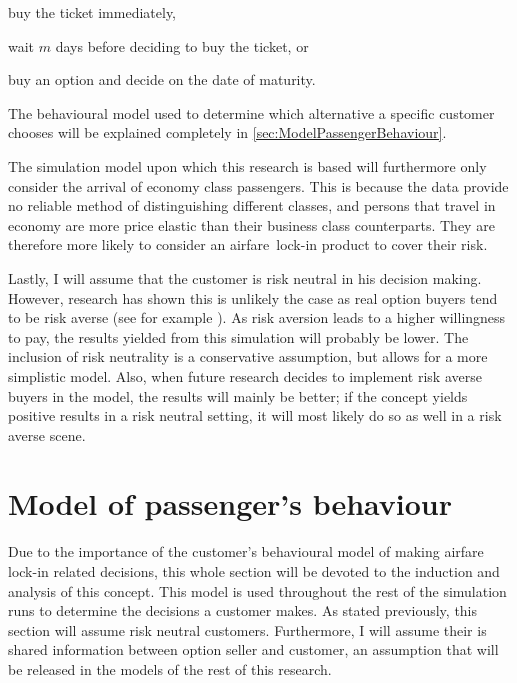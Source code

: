 \begin{compactitem}
    \item buy the ticket immediately,
    \item wait $m$ days before deciding to buy the ticket, or
    \item buy an option and decide on the date of maturity.
\end{compactitem}
\vspace{1em}

The behavioural model used to determine which alternative a specific customer chooses will be explained completely in \autoref{sec:ModelPassengerBehaviour}.


The simulation model upon which this research is based will furthermore only consider the arrival of economy class passengers. This is because the data provide no reliable method of distinguishing different classes, and persons that travel in economy are more price elastic than their business class counterparts. They are therefore more likely to consider an airfare~lock-in product to cover their risk.

Lastly, I will assume that the customer is risk neutral in his decision making. However, research has shown this is unlikely the case as real option buyers tend to be risk averse (see for example \cite{miller2004empirical}). As risk aversion leads to a higher willingness to pay, the results yielded from this simulation will probably be lower. The inclusion of risk neutrality is a conservative assumption, but allows for a more simplistic model. Also, when future research decides to implement risk averse buyers in the model, the results will mainly be better; if the concept yields positive results in a risk neutral setting, it will most likely do so as well in a risk averse scene.


\section{Model of passenger's behaviour}
\label{sec:ModelPassengerBehaviour}
Due to the importance of the customer's behavioural model of making airfare lock-in related decisions, this whole section will be devoted to the induction and analysis of this concept. This model is used throughout the rest of the simulation runs to determine the decisions a customer makes. As stated previously, this section will assume risk neutral customers. Furthermore, I will assume their is shared information between option seller and customer, an assumption that will be released in the models of the rest of this research.

